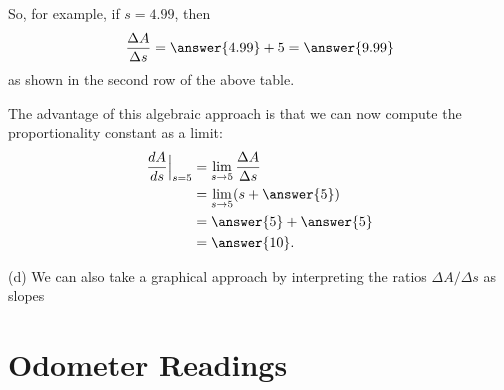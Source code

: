 \documentclass{ximera}
\begin{document}
\begin{question}
So, for example, if $s=4.99$, then
\[
\frac{\Delta A}{\Delta s} = \answer{4.99} + 5 = \answer{9.99} 
\]
as shown in the second row of the above table.

The advantage of this algebraic approach is that we can now compute the proportionality constant as a limit:
\begin{align*}
                    \frac{dA}{ds}\Big|_{s=5} &= \lim_{s\to 5} \frac{\Delta A}{\Delta s} \\
                                                         &=  \lim_{s\to 5} (s+\answer{5}) \\
                                                         &= \answer{5} + \answer{5} \\
                                                           &= \answer{10} .
\end{align*}

(d) We can also take a graphical approach by interpreting the ratios $\Delta A/\Delta s$ as slopes

\end{question}

\section{Odometer Readings}
\end{document}
